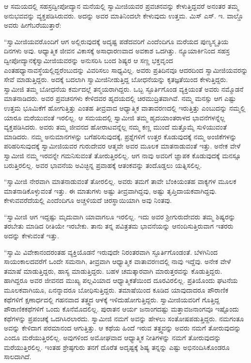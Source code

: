  ಆ ಸಮಯದಲ್ಲಿ ಸಹಸ್ರದ್ವೀಪೋದ್ಯಾನ ಮನೆಯಲ್ಲಿ ಸ್ವಾಮೀಜಿಯವರ ಪ್ರವಚನವನ್ನು ಕೇಳುತ್ತಿದ್ದವರೆ ಅನಂತರ ತಮ್ಮ ಅನುಭವವನ್ನು ವ್ಯಕ್ತಪಡಿಸಿರುವರು. ಅದನ್ನು ಅವರ ಮಾತಿನಿಂದಲೇ ಕೇಳುವುದು ಉತ್ತಮ. ಮಿಸ್ ಎಸ್. ಇ. ವಾಲ್ಡೊ ಅವರು ಹೀಗೆ\break ಬರೆಯುತ್ತಾರೆ: 

 “ಸ್ವಾಮೀಜಿಯವರೊಂದಿಗೆ ಆಗ ಅಲ್ಲಿರುವುದಕ್ಕೆ ಅದೃಷ್ಟ ಪಡೆದವರಿಗೆ ಎಂದೆಂದಿಗೂ ಮರೆಯದ ಪುಣ್ಯಸ್ಮೃತಿಯ ದಿನಗಳು ಅವು. ಆಧ್ಯಾತ್ಮಿಕ ಜೀವನ ವಿಕಾಸಕ್ಕೆ ಅಸಾಧಾರಣವಾದ ಅವಕಾಶ ಒದಗಿತ್ತು. ನ್ಯೂಯಾರ್ಕಿನಿಂದ ಸಹಸ್ರ ದ್ವೀಪೋದ್ಯಾನಕ್ಕೆ\break ಸ್ವಾಮೀಜಿಯವರನ್ನು ಅನುಸರಿಸಿ ಬಂದ ಶಿಷ್ಯರ ಆ ಸಣ್ಣ ಭಕ್ತವೃಂದ ಎಂತಹ\break ಧ್ಯಾನಾವಸ್ಥೆಯಲ್ಲಿದ್ದರೆಂಬುದನ್ನು ವಿವರಿಸಲು ಸಾಧ್ಯವಿಲ್ಲ. ಅವರು ಪ್ರತಿದಿನವೂ ಆದರದಿಂದ ಸ್ವಾಮೀಜಿಯವರನ್ನು ಸೇವೆ ಮಾಡುತ್ತಿದ್ದರು. ಅದಕ್ಕೆ ಬದಲಾಗಿ ಸ್ವಾಮೀಜಿ\break ನೀಡುತ್ತಿದ್ದ ಬೋಧನೆಯನ್ನು ಕೃತಜ್ಞತೆಯಿಂದ ಕೇಳುತ್ತಿದ್ದರು. ಸ್ವಾಮೀಜಿ ತಮ್ಮ ಬೋಧನೆಯ ಕರ್ಮದಲ್ಲೆ ತನ್ಮಯರಾಗಿದ್ದರು. ಒಬ್ಬ ಸ್ಫೂರ್ತಿಗೊಂಡ ವ್ಯಕ್ತಿಯಂತೆ ಅವರು ನಮ್ಮೊಡನೆ ಮಾತನಾಡಿದರು. ಅವರ ಪ್ರವಚನಗಳು ಕೇಳಿದವರ ಹೃದಯದಲ್ಲಿ ಚಿರಮುದ್ರಿತವಾಗಿವೆ. ನಮ್ಮ ಮನಸ್ಸು ಆಗ ಎಷ್ಟು ಉತ್ತಮ ಭೂಮಿಕೆಗೆ ಹೋಗುತ್ತಿತ್ತು ಎಂತಹ ತೀವ್ರವಾದ ಆಧ್ಯಾತ್ಮಿಕ ವಾತಾವರಣದಲ್ಲಿ ಇರುತ್ತಿತ್ತು ಎಂಬುದನ್ನು ನಮ್ಮಲ್ಲಿ ಯಾರೂ ಮರೆಯುವಂತೆ ಇರಲಿಲ್ಲ. ಆ ಸಮಯದಲ್ಲಿ ಸ್ವಾಮೀಜಿ ತಮ್ಮ ಹೃದಯಾಂತರಾಳದ ಭಾವನೆಗಳನ್ನೆಲ್ಲ ವ್ಯಕ್ತಪಡಿಸಿದರು. ಅವರು ತಮ್ಮ ಜೀವನದ ಹೋರಾಟವನ್ನೆಲ್ಲ ನಮ್ಮ ಕಣ್ಣ ಮುಂದೆ ಮತ್ತೊಮ್ಮೆ ಸುಳಿಯುವಂತೆ ಮಾಡಿದರು. ನಮ್ಮ ಅನುಮಾನಗಳನ್ನು ಬಗೆಹರಿಸುವುದಕ್ಕೆ, ಪ್ರಶ್ನೆಗಳಿಗೆ ಉತ್ತರ ಕೊಡುವುದಕ್ಕೆ ನಮ್ಮ ಅಂಜಿಕೆಗಳನ್ನು ಪರಿಹರಿಸುವುದಕ್ಕೆ ಸ್ವಾಮೀಜಿಯವರ ಗುರುದೇವರ ಆತ್ಮವೇ ಅವರ ಮೂಲಕ ಮಾತನಾಡುವಂತೆ ಇತ್ತು. ಅನೇಕ ವೇಳೆ ಸ್ವಾಮೀಜಿ ನಮ್ಮ ಇರವನ್ನೇ ಗಮನಿಸುವಂತೆ ತೋರುತ್ತಿರಲಿಲ್ಲ. ಆಗ ನಾವು ಅವರಿಗೆ ಜ್ಞಾಪಕ ಕೊಡುವುದಕ್ಕೆ ಮನಸ್ಸೂ ಬರುತ್ತಿರಲಿಲ್ಲ. ಅವರ ಭಾವನೆಯ ಅವಿಚ್ಛಿನ್ನ ಪ್ರವಾಹಕ್ಕೆ ಆತಂಕವನ್ನು ತಂದೊಡ್ಡಲು ಯತ್ನಿಸಲಿಲ್ಲ.

 “ಸ್ವಾಮೀಜಿ ನೇರವಾಗಿ ಮಾತನಾಡುವಂತೆ ತೋರಲಿಲ್ಲ. ಅವರು ತಮಗೆ ತಾವೇ ಬೆಂಕಿಯಂತಹ ವಾಕ್ಯಗಳ ಮೂಲಕ ಮಾತನಾಡಿಕೊಳ್ಳುವಂತೆ ಇತ್ತು. ಈ ಮಾತುಗಳು ಅಷ್ಟು ತೀವ್ರವಾಗಿದ್ದವು, ಅಷ್ಟು ತೃಪ್ತಿದಾಯಕವಾಗಿದ್ದವು. ಕೇಳುವವರೆದೆಯಲ್ಲಿ ಎಂದೆಂದಿಗೂ ಅಚ್ಚಳಿಯದೆ ಚಿರಸ್ಥಾಯಿಯಾಗಿ ಅವು ನಿಂತವು.

 “ಸ್ವಾಮೀಜಿ ಆಗ ಇದ್ದಷ್ಟು ಮೃದುವಾಗಿ ಯಾವಾಗಲೂ ಇರಲಿಲ್ಲ. ಇದು ಅವರ ಶ‍್ರೀಗುರುದೇವರು ತಮ್ಮ ಶಿಷ್ಯರನ್ನು ತರಬೇತು ಮಾಡಿದ ರೀತಿಯೇ ಇರಬೇಕು. ತಾನು ತನ್ನ ಪವಿತ್ರತಮ ಭಾವನೆಯನ್ನು ಆನಂದಿಸುತ್ತಿರುವಾಗ ಇತರರು ಅದನ್ನು ಕೇಳುವಂತೆ ಇತ್ತು.

 “ಸ್ವಾಮಿ ವಿವೇಕಾನಂದರಂತಹ ವ್ಯಕ್ತಿಯೊಡನೆ ಇರುವುದೇ ನಿರಂತರವಾಗಿ ಸ್ಫೂರ್ತಿಗೊಂಡಂತೆ. ಬೆಳಗಿನಿಂದ ಸಾಯಂಕಾಲದವರೆಗೆ ಒಂದೇ ಸಮನಾಗಿ, ತೀವ್ರವಾಗಿ ಆಧ್ಯಾತ್ಮಿಕ ವಾತಾವರಣದಲ್ಲಿ ನಾವು ಇದ್ದೆವು. ಅನೇಕ ವೇಳೆ ತಮಾಷೆ ಮಾಡುತ್ತಿದ್ದರು, ಹಾಸ್ಯ ಮಾಡುತ್ತಿದ್ದರು. ಬಹಳ ಚಮತ್ಕಾರವಾಗಿ ಮಾರುತ್ತರವನ್ನು ಕೊಡುತ್ತಿದ್ದರು. ಹಾಗಿದ್ದರೂ ಅವರ ಜೀವನದ ಮುಖ್ಯ ಪಲ್ಲವಿಯಾದ ಆಧ್ಯಾತ್ಮಿಕತೆಯಿಂದ ದೂರವಿರಲಿಲ್ಲ. ಪ್ರತಿಯೊಂದು ಘಟನೆಯ ಮೂಲಕವಾಗಿಯೂ, ಏನನ್ನಾದರೂ ಬೋಧಿಸುತ್ತಿದ್ದರು. ತಮಾಷೆಯಿಂದ ಕೂಡಿದ ಯಾವುದಾದರೂ ಪೌರಾಣಿಕ ಕಥೆಗಳಿಗೆ ಕ್ಷಣಾರ್ಧದಲ್ಲಿ ಗಹನವಾದ ತತ್ತ್ವದ ಆಳಕ್ಕೆ ಇಳಿದುಹೋಗುತ್ತಿದ್ದರು. ಸ್ವಾಮೀಜಿಯವರಿಗೆ ಗೊತ್ತಿದ್ದ ಪೌರಾಣಿಕ\break ಕಥೆಗಳಿಗೆ ಒಂದು ಕೊನೆಮೊದಲಿಲ್ಲ. ಪುರಾತನ ಆರ್ಯ ಜನಾಂಗದಷ್ಟು ಮತ್ತಾವ\break ಜನಾಂಗವೂ ಇಷ್ಟೊಂದು ಕಥೆಗಳನ್ನು ಪ್ರಪಂಚಕ್ಕೆ ಒದಗಿಸಿರಲಾರದು. ಸ್ವಾಮೀಜಿ ನಮಗೆ ಅವನ್ನು ಹೇಳಲು ಸಂತೋಷಪಡುತ್ತಿದ್ದರು. ನಮಗಂತೂ ಅವನ್ನು ಕೇಳಿದಾಗ ಪರಮಾನಂದ ಆಗುತ್ತಿತ್ತು. ಆ ಕಥೆಯ ಹಿಂದೆ ಇರುವ ತತ್ತ್ವವನ್ನು ಅವರು ನಮಗೆ ತೋರುವುದನ್ನು ಎಂದೂ ಮರೆಯುತ್ತಿರಲಿಲ್ಲ. ಅವುಗಳಿಂದ ಅಮೋಘವಾದ ಆಧ್ಯಾತ್ಮಿಕ ನೀತಿಗಳನ್ನು ನಮಗೆ ತೋರುವುದನ್ನು ಮರೆಯುತ್ತಿರಲಿಲ್ಲ. ಇಂತಹ ಶ್ರೇಷ್ಠಗುರು ತನಗೆ ದೊರೆತ ಅದೃಷ್ಟಕ್ಕೆ ಶಿಷ್ಯ ತನ್ನನ್ನು ಎಷ್ಟು ಅಭಿನಂದಿಸಿಕೊಂಡರೂ ಸಾಲದಾಗಿದೆ.

